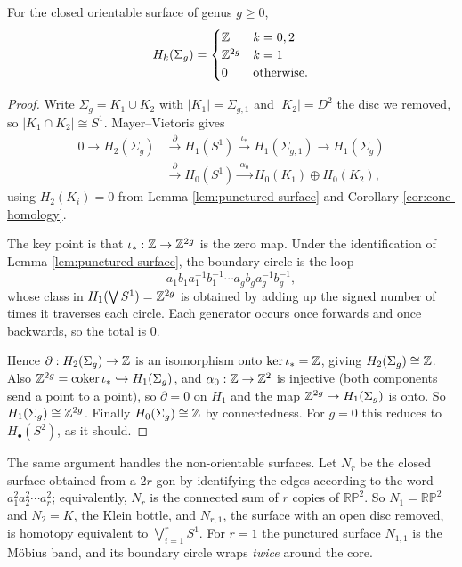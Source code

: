 \documentclass[a4paper]{scrartcl}
\newcommand{\coker}{\operatorname{coker}}
\newcommand{\RP}{\mathbb{RP}}
\begin{document}
\begin{theorem} \label{thm:genus-homology}
	For the closed orientable surface of genus $g \geq 0$,
	$$
	H_k(\Sigma_g) = \begin{cases}\mathbb{Z} & k = 0, 2\\ \mathbb{Z}^{2g} & k = 1\\ 0 & \text{otherwise.}\end{cases}
	$$
\end{theorem}
\begin{proof}
	Write $\Sigma_g = K_1 \cup K_2$ with $|K_1| = \Sigma_{g,1}$ and $|K_2| = D^2$ the disc we removed, so $|K_1\cap K_2| \cong S^1$. Mayer--Vietoris gives
	\begin{align*}
		0 \to H_2(\Sigma_g) &\xrightarrow{\ \partial\ } H_1(S^1) \xrightarrow{\ \iota_*\ } H_1(\Sigma_{g,1}) \to H_1(\Sigma_g)\\
		&\xrightarrow{\ \partial\ } H_0(S^1) \xrightarrow{\ \alpha_0\ } H_0(K_1)\oplus H_0(K_2),
	\end{align*}
	using $H_2(K_i) = 0$ from Lemma \ref{lem:punctured-surface} and Corollary \ref{cor:cone-homology}.

	The key point is that $\iota_*: \mathbb{Z}\to\mathbb{Z}^{2g}$ is the zero map. Under the identification of Lemma \ref{lem:punctured-surface}, the boundary circle is the loop
	$$
	a_1b_1a_1^{-1}b_1^{-1}\cdots a_gb_ga_g^{-1}b_g^{-1},
	$$
	whose class in $H_1(\bigvee S^1) = \mathbb{Z}^{2g}$ is obtained by adding up the signed number of times it traverses each circle. Each generator occurs once forwards and once backwards, so the total is $0$.

	Hence $\partial: H_2(\Sigma_g)\to\mathbb{Z}$ is an isomorphism onto $\ker\iota_* = \mathbb{Z}$, giving $H_2(\Sigma_g)\cong\mathbb{Z}$. Also $\Z^{2g} = \coker\iota_* \hookrightarrow H_1(\Sigma_g)$, and $\alpha_0: \mathbb{Z}\to\mathbb{Z}^2$ is injective (both components send a point to a point), so $\partial = 0$ on $H_1$ and the map $\mathbb{Z}^{2g}\to H_1(\Sigma_g)$ is onto. So $H_1(\Sigma_g)\cong\mathbb{Z}^{2g}$. Finally $H_0(\Sigma_g)\cong\mathbb{Z}$ by connectedness. For $g = 0$ this reduces to $H_\bullet(S^2)$, as it should.
\end{proof}

The same argument handles the non-orientable surfaces. Let $N_r$ be the closed surface
obtained from a $2r$-gon by identifying the edges according to the word
$a_1^2a_2^2\cdots a_r^2$; equivalently, $N_r$ is the connected sum of $r$ copies of
$\RP^2$. So $N_1 = \RP^2$ and $N_2 = K$, the Klein bottle, and $N_{r,1}$, the surface with
an open disc removed, is homotopy equivalent to $\bigvee_{i=1}^r S^1$. For $r = 1$ the
punctured surface $N_{1,1}$ is the M\"obius band, and its boundary circle wraps
\emph{twice} around the core.
\end{document}
